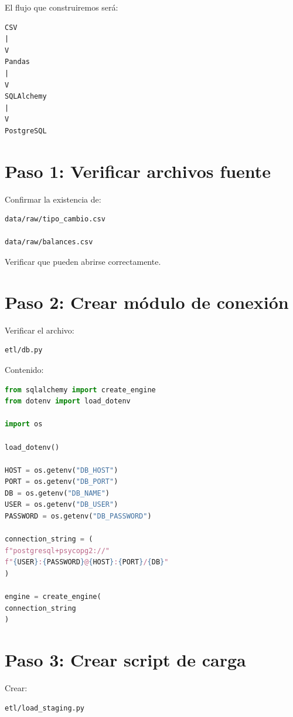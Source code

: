 El flujo que construiremos será:

\begin{verbatim}
CSV
|
V
Pandas
|
V
SQLAlchemy
|
V
PostgreSQL
\end{verbatim}

\section{Paso 1: Verificar archivos fuente}

Confirmar la existencia de:

\begin{verbatim}
data/raw/tipo_cambio.csv

data/raw/balances.csv
\end{verbatim}

Verificar que pueden abrirse correctamente.

\section{Paso 2: Crear módulo de conexión}

Verificar el archivo:

\begin{verbatim}
etl/db.py
\end{verbatim}

Contenido:

\begin{lstlisting}[language=Python]
from sqlalchemy import create_engine
from dotenv import load_dotenv

import os

load_dotenv()

HOST = os.getenv("DB_HOST")
PORT = os.getenv("DB_PORT")
DB = os.getenv("DB_NAME")
USER = os.getenv("DB_USER")
PASSWORD = os.getenv("DB_PASSWORD")

connection_string = (
f"postgresql+psycopg2://"
f"{USER}:{PASSWORD}@{HOST}:{PORT}/{DB}"
)

engine = create_engine(
connection_string
)
\end{lstlisting}

\section{Paso 3: Crear script de carga}

Crear:

\begin{verbatim}
etl/load_staging.py
\end{verbatim}

